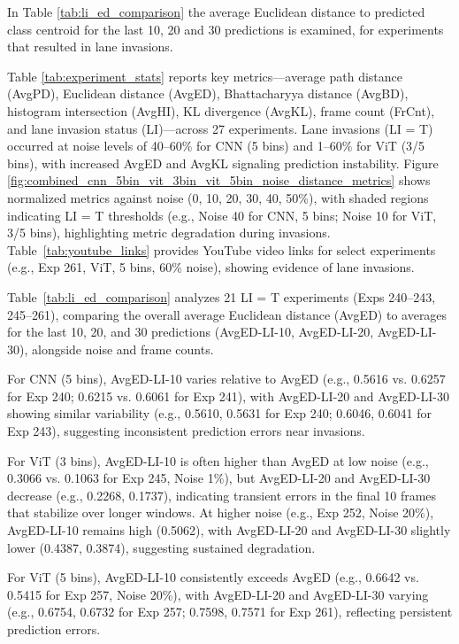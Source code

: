 In Table \ref{tab:li_ed_comparison} the average Euclidean distance to predicted class centroid for the last 10, 20 and 30 predictions is examined, for experiments that resulted in lane invasions.

Table \ref{tab:experiment_stats} reports key metrics—average path distance (AvgPD), Euclidean distance (AvgED), Bhattacharyya distance (AvgBD), histogram intersection (AvgHI), KL divergence (AvgKL), frame count (FrCnt), and lane invasion status (LI)—across 27 experiments. Lane invasions (LI = T) occurred at noise levels of 40–60\% for CNN (5 bins) and 1–60\% for ViT (3/5 bins), with increased AvgED and AvgKL signaling prediction instability. Figure \ref{fig:combined_cnn_5bin_vit_3bin_vit_5bin_noise_distance_metrics} shows normalized metrics against noise (0, 10, 20, 30, 40, 50\%), with shaded regions indicating LI = T thresholds (e.g., Noise 40 for CNN, 5 bins; Noise 10 for ViT, 3/5 bins), highlighting metric degradation during invasions. Table~\ref{tab:youtube_links} provides YouTube video links for select experiments (e.g., Exp 261, ViT, 5 bins, 60\% noise), showing evidence of lane invasions.

Table~\ref{tab:li_ed_comparison} analyzes 21 LI = T experiments (Exps 240–243, 245–261), comparing the overall average Euclidean distance (AvgED) to averages for the last 10, 20, and 30 predictions (AvgED-LI-10, AvgED-LI-20, AvgED-LI-30), alongside noise and frame counts.

For CNN (5 bins), AvgED-LI-10 varies relative to AvgED (e.g., 0.5616 vs. 0.6257 for Exp 240; 0.6215 vs. 0.6061 for Exp 241), with AvgED-LI-20 and AvgED-LI-30 showing similar variability (e.g., 0.5610, 0.5631 for Exp 240; 0.6046, 0.6041 for Exp 243), suggesting inconsistent prediction errors near invasions.

For ViT (3 bins), AvgED-LI-10 is often higher than AvgED at low noise (e.g., 0.3066 vs. 0.1063 for Exp 245, Noise 1\%), but AvgED-LI-20 and AvgED-LI-30 decrease (e.g., 0.2268, 0.1737), indicating transient errors in the final 10 frames that stabilize over longer windows. At higher noise (e.g., Exp 252, Noise 20\%), AvgED-LI-10 remains high (0.5062), with AvgED-LI-20 and AvgED-LI-30 slightly lower (0.4387, 0.3874), suggesting sustained degradation.

For ViT (5 bins), AvgED-LI-10 consistently exceeds AvgED (e.g., 0.6642 vs. 0.5415 for Exp 257, Noise 20\%), with AvgED-LI-20 and AvgED-LI-30 varying (e.g., 0.6754, 0.6732 for Exp 257; 0.7598, 0.7571 for Exp 261), reflecting persistent prediction errors.

